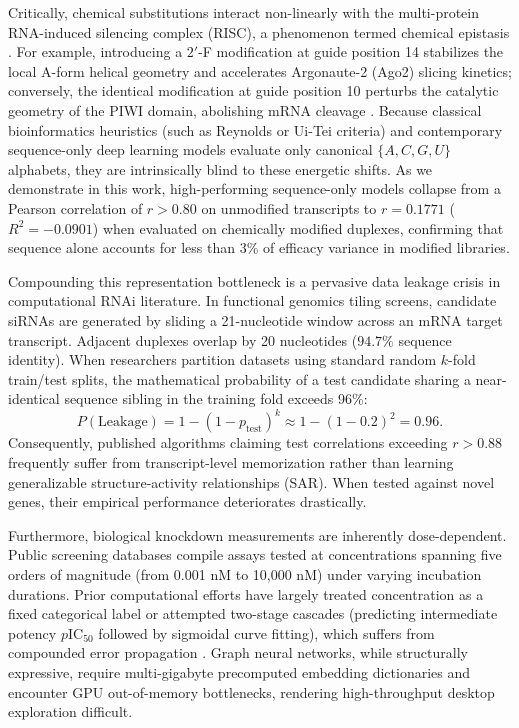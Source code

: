 \documentclass[twocolumn]{article}
\begin{document}
Critically, chemical substitutions interact non-linearly with the multi-protein RNA-induced silencing complex (RISC), a phenomenon termed chemical epistasis \cite{davis2025nar}. For example, introducing a $2'$-F modification at guide position 14 stabilizes the local A-form helical geometry and accelerates Argonaute-2 (Ago2) slicing kinetics; conversely, the identical modification at guide position 10 perturbs the catalytic geometry of the PIWI domain, abolishing mRNA cleavage \cite{uppuladinne2019jbsd}. Because classical bioinformatics heuristics (such as Reynolds or Ui-Tei criteria) \cite{reynolds2004rational,uitei2004guidelines} and contemporary sequence-only deep learning models evaluate only canonical $\{A, C, G, U\}$ alphabets, they are intrinsically blind to these energetic shifts. As we demonstrate in this work, high-performing sequence-only models collapse from a Pearson correlation of $r > 0.80$ on unmodified transcripts to $r = 0.1771$ ($R^2 = -0.0901$) when evaluated on chemically modified duplexes, confirming that sequence alone accounts for less than 3\% of efficacy variance in modified libraries.

Compounding this representation bottleneck is a pervasive data leakage crisis in computational RNAi literature. In functional genomics tiling screens, candidate siRNAs are generated by sliding a 21-nucleotide window across an mRNA target transcript. Adjacent duplexes overlap by 20 nucleotides ($94.7\%$ sequence identity). When researchers partition datasets using standard random $k$-fold train/test splits, the mathematical probability of a test candidate sharing a near-identical sequence sibling in the training fold exceeds 96\%:
\begin{equation}
P(\text{Leakage}) = 1 - (1 - p_{\text{test}})^k \approx 1 - (1 - 0.2)^2 = 0.96.
\end{equation}
Consequently, published algorithms claiming test correlations exceeding $r > 0.88$ frequently suffer from transcript-level memorization rather than learning generalizable structure-activity relationships (SAR). When tested against novel genes, their empirical performance deteriorates drastically.

Furthermore, biological knockdown measurements are inherently dose-dependent. Public screening databases compile assays tested at concentrations spanning five orders of magnitude (from 0.001 nM to 10,000 nM) under varying incubation durations. Prior computational efforts have largely treated concentration as a fixed categorical label or attempted two-stage cascades (predicting intermediate potency $p\text{IC}_{50}$ followed by sigmoidal curve fitting), which suffers from compounded error propagation \cite{davis2025nar}. Graph neural networks, while structurally expressive, require multi-gigabyte precomputed embedding dictionaries and encounter GPU out-of-memory bottlenecks, rendering high-throughput desktop exploration difficult.
\end{document}
